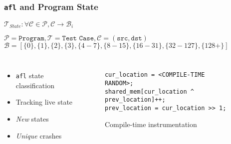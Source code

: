 \begin{frame}[fragile]
\frametitle{\texttt{afl} and Program State}

\begin{center}
$\mathcal{T}_{State}\colon \forall \mathcal{C}\in\mathcal{P}, \mathcal{C}\rightarrow \mathcal{B}_i$
\end{center}

$\mathcal{P} = \texttt{Program}, \mathcal{T} = \texttt{Test Case}, \mathcal{C} = (\texttt{src}, \texttt{dst})$
$\mathcal{B} = [\{0\}, \{1\}, \{2\}, \{3\}, \{4-7\}, \{8-15\}, \{16-31\}, \{32-127\}, \{128+\}]$


\begin{columns}[c]


\begin{itemize}
    \item \texttt{afl} state classification
    \item Tracking live state
    \item \textit{New} states
    \item \textit{Unique} crashes
\end{itemize}


\begin{figure}
\begin{lstlisting}[language={[ANSI]C},frame=single]
cur_location = <COMPILE-TIME RANDOM>;
shared_mem[cur_location ^ prev_location]++;
prev_location = cur_location >> 1;\end{lstlisting}
\caption{Compile-time instrumentation}
\label{fig:instrumentation}
\end{figure}

\end{columns}

\end{frame}
